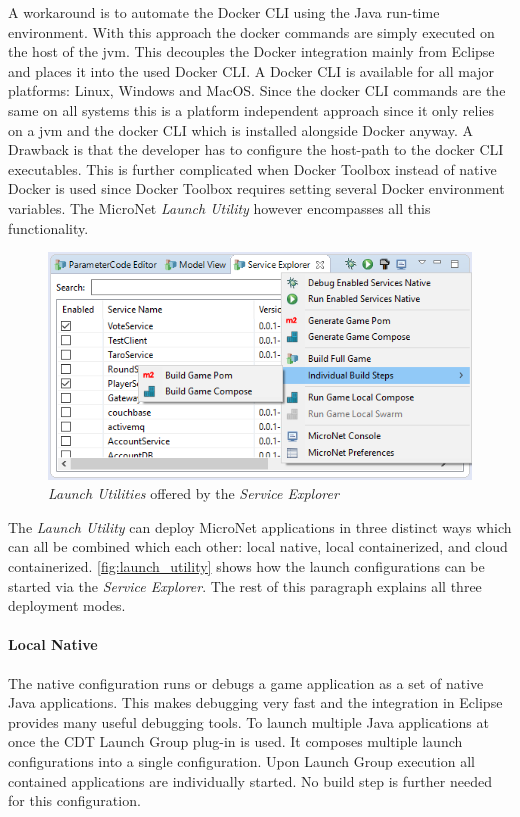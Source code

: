 A workaround is to automate the Docker CLI using the Java run-time environment.
With this approach the docker commands are simply executed on the host of the
\gls{jvm}. This decouples the Docker integration mainly from Eclipse and places
it into the used Docker CLI. A Docker CLI is available for all major platforms:
Linux, Windows and MacOS. Since the docker CLI commands are the same on all
systems this is a platform independent approach since it only relies on a
\gls{jvm} and the docker CLI which is installed alongside Docker anyway. A
Drawback is that the developer has to configure the host-path to the docker CLI
executables. This is further complicated when Docker Toolbox instead of native
Docker is used since Docker Toolbox requires setting several Docker environment
variables. The MicroNet \textit{Launch Utility} however encompasses all this
functionality.

\begin{figure}
	\centering
	\includegraphics[width=14cm]{images/tools/LaunchUtility}
	\caption{\textit{Launch Utilities} offered by the \textit{Service Explorer}}
	\label{fig:launch_utility}
\end{figure}

The \textit{Launch Utility} can deploy MicroNet applications in three distinct ways which
can all be combined which each other: local native, local containerized, and
cloud containerized. \autoref{fig:launch_utility} shows how the launch
configurations can be started via the \textit{Service Explorer}. The rest of this
paragraph explains all three deployment modes.

\paragraph{Local Native}

The native configuration runs or debugs a game application as a set of native
Java applications. This makes debugging very fast and the integration in Eclipse
provides many useful debugging tools. To launch multiple Java applications at
once the CDT Launch Group plug-in is used. It composes multiple launch
configurations into a single configuration. Upon Launch Group execution all
contained applications are individually started. No build step is further needed
for this configuration.

